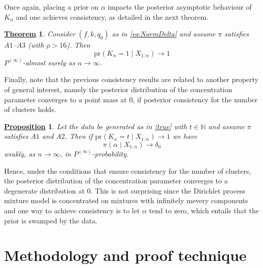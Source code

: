 \documentclass[12pt]{article}
\newtheorem{Thm}{\underline{\bf Theorem}}
\newtheorem{Prop}{\underline{\bf Proposition}}
\begin{document}
Once again, placing a prior on $\alpha$ %
impacts the posterior asymptotic behaviour of $K_n$ and one achieves consistency, as detailed in the next theorem.
\begin{Thm}\label{th:ConsNormDelta}
Consider $(f, k, q_0)$ as in \eqref{eq:NormDelta} and assume $\pi$ satisfies %
$A1$--$A3$ (with $\rho > 16$). Then
\[
\text{pr}(K_n = 1 \mid X_{1:n}) \to 1 
\] 
$P^{(\infty)}$-almost surely as $n\to \infty$.
\end{Thm}
Finally, note that %
the previous consistency results are related to another property %
of general interest, namely %
the posterior distribution of the concentration parameter converges to a point mass at $0$, %
if posterior consistency for the number of clusters holds.
\begin{Prop}\label{prop:PostAlpha}
Let the data be generated as in \eqref{true} with $t \in \mathbb{N}$ and assume $\pi$ satisfies $A1$ and $A2$. Then if $\text{pr}(K_n = t \mid X_{1:n}) \to 1$
we have
\[
\pi(\alpha \mid X_{1:n}) \rightarrow \delta_0 %
\]
weakly, as $n \to \infty$, in $P^{(\infty)}$-probability.
\end{Prop}
Hence, under the conditions that ensure consistency for the number of clusters, the posterior distribution of the concentration parameter converges to a degenerate distribution at $0$. 
This is not surprising since the Dirichlet process mixture model is concentrated on mixtures with infinitely mevery components and one way to achieve consistency is to let $\alpha$ tend to zero, which entails that %
the prior is swamped by the data.

\section{Methodology and proof technique}\label{sec:Methodology}
\end{document}
